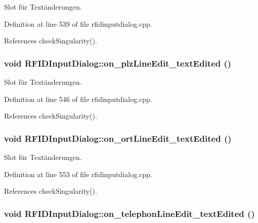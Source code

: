 Slot für Textänderungen. 



Definition at line 539 of file rfidinputdialog.cpp.

References checkSingularity().\hypertarget{class_r_f_i_d_input_dialog_6136d9ac2c0400239d01f06269fb1865}{
\subsubsection[on\_\-plzLineEdit\_\-textEdited]{\setlength{\rightskip}{0pt plus 5cm}void RFIDInputDialog::on\_\-plzLineEdit\_\-textEdited ()}}
\label{class_r_f_i_d_input_dialog_6136d9ac2c0400239d01f06269fb1865}


Slot für Textänderungen. 



Definition at line 546 of file rfidinputdialog.cpp.

References checkSingularity().\hypertarget{class_r_f_i_d_input_dialog_159c213b7684ba916d9c047c76fab2e5}{
\subsubsection[on\_\-ortLineEdit\_\-textEdited]{\setlength{\rightskip}{0pt plus 5cm}void RFIDInputDialog::on\_\-ortLineEdit\_\-textEdited ()}}
\label{class_r_f_i_d_input_dialog_159c213b7684ba916d9c047c76fab2e5}


Slot für Textänderungen. 



Definition at line 553 of file rfidinputdialog.cpp.

References checkSingularity().\hypertarget{class_r_f_i_d_input_dialog_ca45d88bae73e41a219177aeb471b789}{
\subsubsection[on\_\-telephonLineEdit\_\-textEdited]{\setlength{\rightskip}{0pt plus 5cm}void RFIDInputDialog::on\_\-telephonLineEdit\_\-textEdited ()}}
\label{class_r_f_i_d_input_dialog_ca45d88bae73e41a219177aeb471b789}



